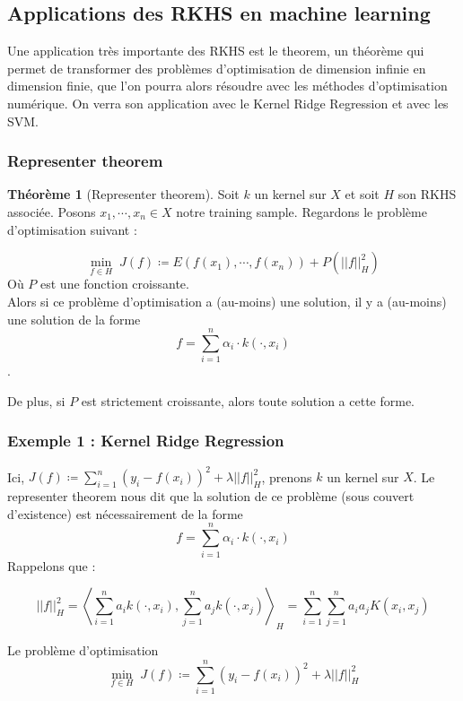 \documentclass[a4paper, 11pt, french]{article}
\theoremstyle{definition}
\newtheorem{theorem}{Théorème}
\begin{document}
	\subsection{Applications des RKHS en machine learning}
	
	Une application très importante des RKHS est le theorem, un théorème qui permet de transformer des problèmes d'optimisation de dimension infinie en dimension finie, que l'on pourra alors résoudre avec les méthodes d'optimisation numérique. On verra son application avec le Kernel Ridge Regression et avec les SVM.
	
	\subsubsection{Representer theorem}
	
	\begin{theorem}[Representer theorem]
		Soit $k$ un kernel sur $X$ et soit $H$ son RKHS associée. Posons $x_1, \cdots, x_n \in X$ notre training sample. Regardons le problème d'optimisation suivant :
		
		\[\min_{f \in H} \; J(f) \coloneqq E(f(x_1), \cdots, f(x_n)) + P(||f||_H^2)\]
		Où $P$ est une fonction croissante. \\
		
		Alors si ce problème d'optimisation a (au-moins) une solution, il y a (au-moins) une solution de la forme \[f = \sum_{i=1}^{n} \alpha_i \cdot k(\cdot, x_i)\].
		
		De plus, si $P$ est strictement croissante, alors toute solution a cette forme.
	\end{theorem}

	\subsubsection{Exemple 1 : Kernel Ridge Regression}
	
	Ici, $J(f) \coloneqq \sum_{i=1}^{n} (y_i - f(x_i))^2 + \lambda ||f||_H^2$, prenons $k$ un kernel sur $X$. Le representer theorem nous dit que la solution de ce problème (sous couvert d'existence) est nécessairement de la forme 
	\[f = \sum_{i=1}^{n} \alpha_i \cdot k(\cdot, x_i)\]
	Rappelons que :
	
	\[||f||_H^2 = \left\langle \sum_{i=1}^{n} a_i k(\cdot, x_i), \sum_{j=1}^{n} a_j k(\cdot, x_j) \right\rangle_H = \sum_{i=1}^{n} \sum_{j=1}^{n} a_i a_j K(x_i, x_j)\]
	
	Le problème d'optimisation \[\min_{f \in H} \; J(f) \coloneqq \sum_{i=1}^{n} (y_i - f(x_i))^2 + \lambda ||f||_H^2\]
	
\end{document}
